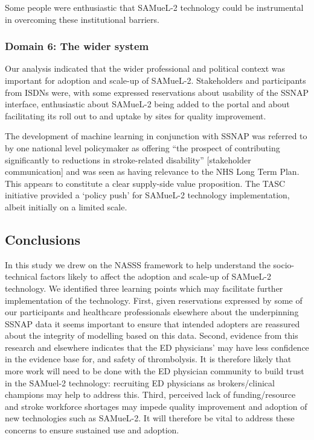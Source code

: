 Some people were enthusiastic that SAMueL-2 technology could be instrumental in overcoming these institutional barriers.

\subsubsection{Domain 6: The wider system}

Our analysis indicated that the wider professional and political context was important for adoption and scale-up of SAMueL-2. Stakeholders and participants from ISDNs were, with some expressed reservations about usability of the SSNAP interface, enthusiastic about SAMueL-2 being added to the portal and about facilitating its roll out to and uptake by sites for quality improvement.

The development of machine learning in conjunction with SSNAP was referred to by one national level policymaker as offering “the prospect of contributing significantly to reductions in stroke-related disability” [stakeholder communication] and was seen as having relevance to the NHS Long Term Plan. This appears to constitute a clear supply-side value proposition. The TASC initiative provided a ‘policy push’ for SAMueL-2 technology implementation, albeit initially on a limited scale.

\subsection{Conclusions}

In this study we drew on the NASSS framework to help understand the socio-technical factors likely to affect the adoption and scale-up of SAMueL-2 technology. We identified three learning points which may facilitate further implementation of the technology. First, given reservations expressed by some of our participants and healthcare professionals elsewhere about the underpinning SSNAP data it seems important to ensure that intended adopters are reassured about the integrity of modelling based on this data. Second, evidence from this research and elsewhere indicates that the ED physicians’ may have less confidence in the evidence base for, and safety of thrombolysis. It is therefore likely that more work will need to be done with the ED physician community to build trust in the SAMuel-2 technology: recruiting ED physicians as brokers/clinical champions may help to address this. Third, perceived lack of funding/resource and stroke workforce shortages may impede quality improvement and adoption of new technologies such as SAMueL-2. It will therefore be vital to address these concerns to ensure sustained use and adoption.